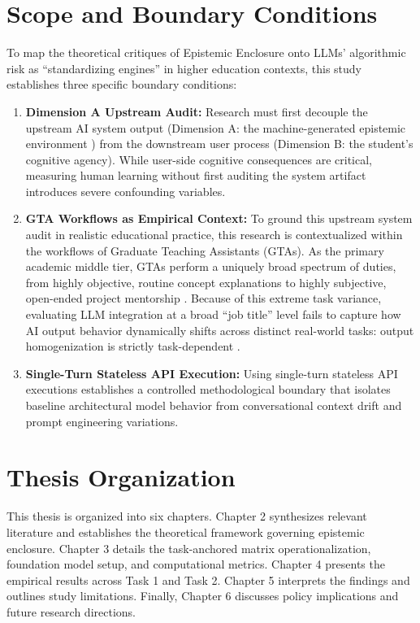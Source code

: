 \section{Scope and Boundary Conditions}
To map the theoretical critiques of Epistemic Enclosure onto LLMs' algorithmic risk as ``standardizing engines'' in higher education contexts, this study establishes three specific boundary conditions:
\begin{enumerate}
  \item \textbf{Dimension A Upstream Audit:} Research must first decouple the upstream AI system output (Dimension A: the machine-generated epistemic environment \cite{Santos2014}) from the downstream user process (Dimension B: the student's cognitive agency). While user-side cognitive consequences are critical, measuring human learning without first auditing the system artifact introduces severe confounding variables.
  \item \textbf{GTA Workflows as Empirical Context:} To ground this upstream system audit in realistic educational practice, this research is contextualized within the workflows of Graduate Teaching Assistants (GTAs). As the primary academic middle tier, GTAs perform a uniquely broad spectrum of duties, from highly objective, routine concept explanations to highly subjective, open-ended project mentorship \cite{Bousquet2008, Muzaka2009}. Because of this extreme task variance, evaluating LLM integration at a broad ``job title'' level fails to capture how AI output behavior dynamically shifts across distinct real-world tasks: output homogenization is strictly task-dependent \cite{Jain2025}.
  \item \textbf{Single-Turn Stateless API Execution:} Using single-turn stateless API executions establishes a controlled methodological boundary that isolates baseline architectural model behavior from conversational context drift and prompt engineering variations.
\end{enumerate}

\section{Thesis Organization}
This thesis is organized into six chapters. Chapter 2 synthesizes relevant literature and establishes the theoretical framework governing epistemic enclosure. Chapter 3 details the task-anchored matrix operationalization, foundation model setup, and computational metrics. Chapter 4 presents the empirical results across Task 1 and Task 2. Chapter 5 interprets the findings and outlines study limitations. Finally, Chapter 6 discusses policy implications and future research directions.

